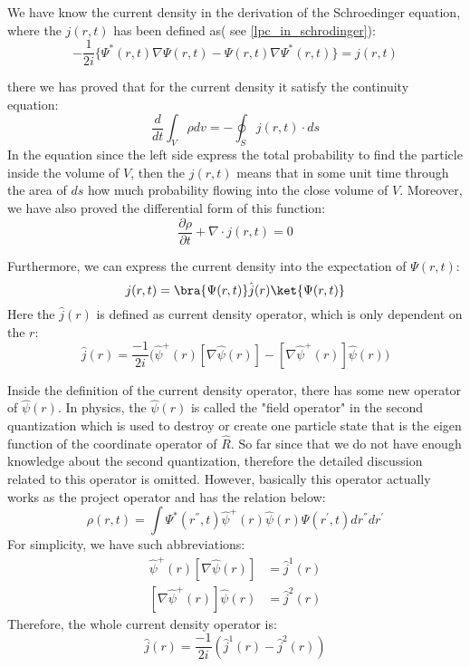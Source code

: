 We have know the current density in the derivation of the
Schroedinger equation, where the $j(r,t)$ has been defined
as( see \ref{lpc_in_schrodinger}): 
\begin{equation}\label{TDDFTeq:8}
-\frac{1}{2i}\{\Psi^{*}(r,t)\nabla\Psi(r,t)
-\Psi(r,t)\nabla\Psi^{*}(r,t)\} = j(r,t)
\end{equation}

there we has proved that for the current density it satisfy the
continuity equation:
\begin{equation}\label{}
\frac{d}{dt}\int_{V}\rho dv =-\oint_{S}j(r,t)\cdot ds
\end{equation}
In the equation since the left side express the total probability to
find the particle inside the volume of $V$, then the $j(r,t)$ means
that in some unit time through the area of $ds$ how much probability
flowing into the close volume of $V$. Moreover, we have also proved
the differential form of this function:
\begin{equation}\label{}
\frac{\partial\rho}{\partial t} + \nabla\cdot j(r,t) = 0
\end{equation}

Furthermore, we can express the current density into the expectation
of $\Psi(r,t)$:
\begin{equation}\label{TDDFTeq:9}
j(r,t) = \bra{\Psi(r,t)}\hat{j}(r)\ket{\Psi(r,t)}
\end{equation}
Here the $\hat{j}(r)$ is defined as current density operator, which
is only dependent on the $r$:
\begin{equation}\label{TDDFTeq:2}
\hat{j}(r) =
\frac{-1}{2i}\Big(\hat{\psi}^{+}(r)[\nabla\hat{\psi}(r)]
-[\nabla\hat{\psi}^{+}(r)]\hat{\psi}(r)\Big)
\end{equation}

Inside the definition of the current density operator, there has
some new operator of $\hat{\psi}(r)$. In physics, the
$\hat{\psi}(r)$ is called the "field operator" in the second
quantization which is used to destroy or create one particle state
that is the eigen function of the coordinate operator of
$\hat{R}$\cite{weitaoYang}. So far since that we do not have enough
knowledge about the second quantization, therefore the detailed
discussion related to this operator is omitted. However, basically
this operator actually works as the project operator and has the
relation below:
\begin{equation}\label{TDDFTeq:14}
\rho(r,t) = \int
\Psi^{*}(r^{''},t)\hat{\psi}^{+}(r)\hat{\psi}(r)\Psi(r^{'},t)
dr^{''}dr^{'}
\end{equation}
For simplicity, we have such abbreviations:
\begin{align}\label{}
\hat{\psi}^{+}(r)[\nabla\hat{\psi}(r)] &= \hat{j}^{1}(r) \nonumber
\\
[\nabla\hat{\psi}^{+}(r)]\hat{\psi}(r) &= \hat{j}^{2}(r)
\end{align}
Therefore, the whole current density operator is:
\begin{equation}\label{}
\hat{j}(r) = \frac{-1}{2i}(\hat{j}^{1}(r) - \hat{j}^{2}(r))
\end{equation}

